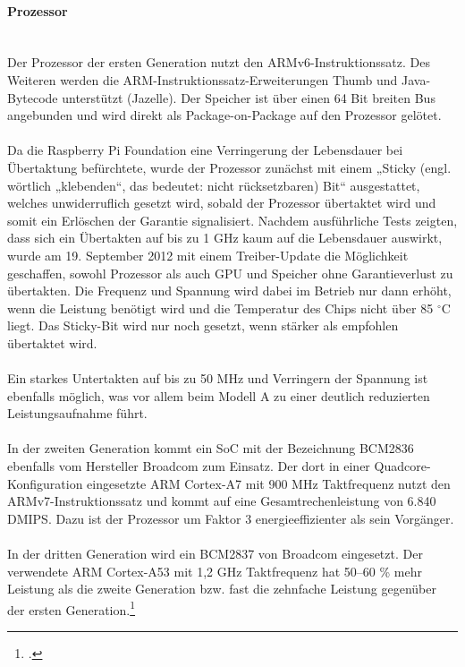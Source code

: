 \paragraph{Prozessor}\ \\
Der Prozessor der ersten Generation nutzt den ARMv6-Instruktionssatz. Des Weiteren werden die ARM-Instruktionssatz-Erweiterungen Thumb und Java-Bytecode unterstützt (Jazelle). Der Speicher ist über einen 64 Bit breiten Bus angebunden und wird direkt als Package-on-Package auf den Prozessor gelötet.\\
\\
Da die Raspberry Pi Foundation eine Verringerung der Lebensdauer bei Übertaktung befürchtete, wurde der Prozessor zunächst mit einem „Sticky (engl. wörtlich „klebenden“, das bedeutet: nicht rücksetzbaren) Bit“ ausgestattet, welches unwiderruflich gesetzt wird, sobald der Prozessor übertaktet wird und somit ein Erlöschen der Garantie signalisiert. Nachdem ausführliche Tests zeigten, dass sich ein Übertakten auf bis zu 1 GHz kaum auf die Lebensdauer auswirkt, wurde am 19. September 2012 mit einem Treiber-Update die Möglichkeit geschaffen, sowohl Prozessor als auch GPU und Speicher ohne Garantieverlust zu übertakten. Die Frequenz und Spannung wird dabei im Betrieb nur dann erhöht, wenn die Leistung benötigt wird und die Temperatur des Chips nicht über 85 $^{\circ}$C liegt. Das Sticky-Bit wird nur noch gesetzt, wenn stärker als empfohlen übertaktet wird.\\
\\
Ein starkes Untertakten auf bis zu 50 MHz und Verringern der Spannung ist ebenfalls möglich, was vor allem beim Modell A zu einer deutlich reduzierten Leistungsaufnahme führt.\\
\\
In der zweiten Generation kommt ein SoC mit der Bezeichnung BCM2836 ebenfalls vom Hersteller Broadcom zum Einsatz. Der dort in einer Quadcore-Konfiguration eingesetzte ARM Cortex-A7 mit 900 MHz Taktfrequenz nutzt den ARMv7-Instruktionssatz und kommt auf eine Gesamtrechenleistung von 6.840 DMIPS. Dazu ist der Prozessor um Faktor 3 energieeffizienter als sein Vorgänger.\\
\\
In der dritten Generation wird ein BCM2837 von Broadcom eingesetzt. Der verwendete ARM Cortex-A53 mit 1,2 GHz Taktfrequenz hat 50–60 \% mehr Leistung als die zweite Generation bzw. fast die zehnfache Leistung gegenüber der ersten Generation.\footcite{shit_raspi}

